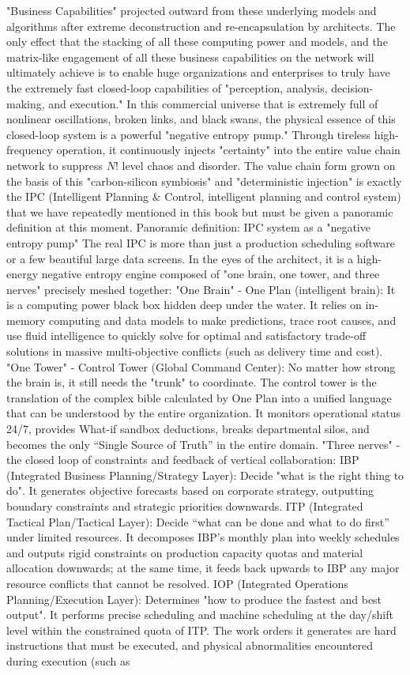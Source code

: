 \documentclass[11pt,a4paper]{article}
\begin{document}
"Business Capabilities" projected outward from these underlying models and algorithms after extreme deconstruction and re-encapsulation by architects. The only effect that the stacking of all these computing power and models, and the matrix-like engagement of all these business capabilities on the network will ultimately achieve is to enable huge organizations and enterprises to truly have the extremely fast closed-loop capabilities of "perception, analysis, decision-making, and execution." In this commercial universe that is extremely full of nonlinear oscillations, broken links, and black swans, the physical essence of this closed-loop system is a powerful "negative entropy pump." Through tireless high-frequency operation, it continuously injects "certainty" into the entire value chain network to suppress $N!$ level chaos and disorder. The value chain form grown on the basis of this "carbon-silicon symbiosis" and "deterministic injection" is exactly the IPC (Intelligent Planning \& Control, intelligent planning and control system) that we have repeatedly mentioned in this book but must be given a panoramic definition at this moment. Panoramic definition: IPC system as a "negative entropy pump" The real IPC is more than just a production scheduling software or a few beautiful large data screens. In the eyes of the architect, it is a high-energy negative entropy engine composed of "one brain, one tower, and three nerves" precisely meshed together: "One Brain" - One Plan (intelligent brain): It is a computing power black box hidden deep under the water. It relies on in-memory computing and data models to make predictions, trace root causes, and use fluid intelligence to quickly solve for optimal and satisfactory trade-off solutions in massive multi-objective conflicts (such as delivery time and cost). "One Tower" - Control Tower (Global Command Center): No matter how strong the brain is, it still needs the "trunk" to coordinate. The control tower is the translation of the complex bible calculated by One Plan into a unified language that can be understood by the entire organization. It monitors operational status 24/7, provides What-if sandbox deductions, breaks departmental silos, and becomes the only “Single Source of Truth” in the entire domain. "Three nerves" - the closed loop of constraints and feedback of vertical collaboration: IBP (Integrated Business Planning/Strategy Layer): Decide "what is the right thing to do". It generates objective forecasts based on corporate strategy, outputting boundary constraints and strategic priorities downwards. ITP (Integrated Tactical Plan/Tactical Layer): Decide “what can be done and what to do first” under limited resources. It decomposes IBP's monthly plan into weekly schedules and outputs rigid constraints on production capacity quotas and material allocation downwards; at the same time, it feeds back upwards to IBP any major resource conflicts that cannot be resolved. IOP (Integrated Operations Planning/Execution Layer): Determines "how to produce the fastest and best output". It performs precise scheduling and machine scheduling at the day/shift level within the constrained quota of ITP. The work orders it generates are hard instructions that must be executed, and physical abnormalities encountered during execution (such as 
\end{document}
